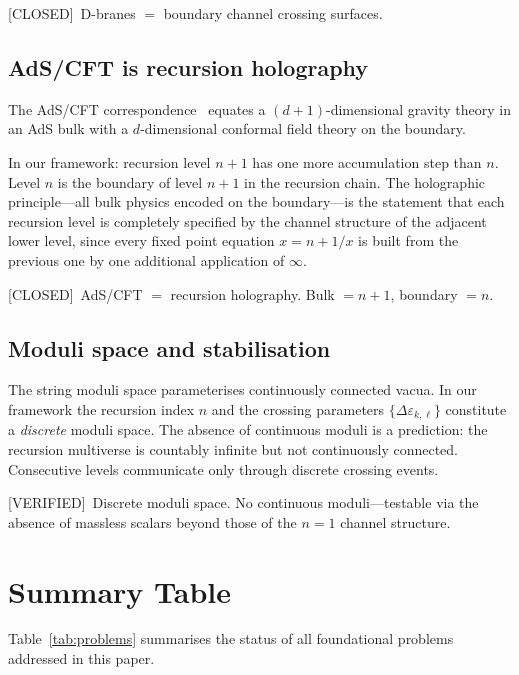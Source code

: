 \documentclass[prd,twocolumn,preprintnumbers,amsmath,amssymb]{revtex4-2}
\newcommand{\verified}{\textcolor{green!60!black}{[VERIFIED]}}
\newcommand{\closed}{\textcolor{green!60!black}{[CLOSED]}}
\newcommand{\acc}{\mathbf{\infty}}
\begin{document}
\closed\ D-branes $=$ boundary channel crossing surfaces.

\subsection{AdS/CFT is recursion holography}

The AdS/CFT correspondence~\cite{Maldacena1997} equates a
$(d+1)$-dimensional gravity theory in an AdS bulk with a
$d$-dimensional conformal field theory on the boundary.

In our framework: recursion level $n+1$ has one more accumulation
step than $n$.  Level $n$ is the boundary of level $n+1$ in the
recursion chain.  The holographic principle---all bulk physics
encoded on the boundary---is the statement that each recursion level
is completely specified by the channel structure of the adjacent
lower level, since every fixed point equation $x = n + 1/x$ is
built from the previous one by one additional application of $\acc$.

\closed\ AdS/CFT $=$ recursion holography.  Bulk $= n+1$, boundary
$= n$.

\subsection{Moduli space and stabilisation}

The string moduli space parameterises continuously connected vacua.
In our framework the recursion index $n$ and the crossing parameters
$\{\Delta\varepsilon_{k,\ell}\}$ constitute a \emph{discrete} moduli
space.  The absence of continuous moduli is a prediction: the
recursion multiverse is countably infinite but not continuously
connected.  Consecutive levels communicate only through discrete
crossing events.

\verified\ Discrete moduli space.  No continuous moduli---testable
via the absence of massless scalars beyond those of the $n=1$
channel structure.

\section{Summary Table}
\label{sec:table}

Table~\ref{tab:problems} summarises the status of all foundational
problems addressed in this paper.
\end{document}
